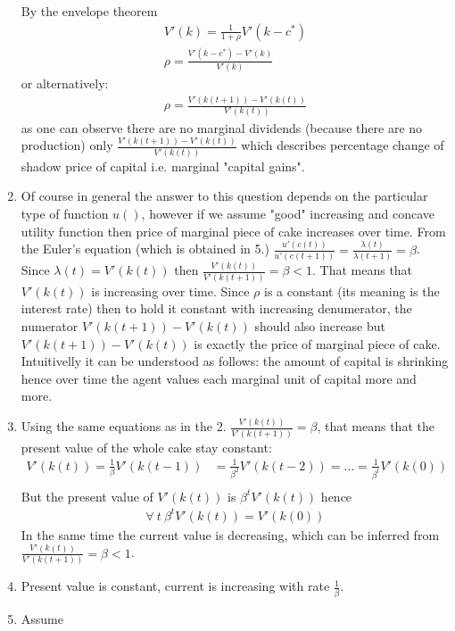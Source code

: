\documentclass[a4paper]{article}
\begin{document}
\begin{enumerate}
	
	By the envelope theorem
	\begin{align*}
	V'(k) = \frac{1}{1+\rho}V'(k-c^*)\\
	\rho = \frac{V'(k-c^*) - V'(k)}{V'(k)}
	\end{align*}
	or alternatively:
	\begin{align*}
	\rho = \frac{V'(k(t+1)) - V'(k(t))}{V'(k(t))}
	\end{align*}
	as one can observe there are no marginal dividends (because there are no production) only $\frac{V'(k(t+1)) - V'(k(t))}{V'(k(t))}$ which describes percentage change of shadow price of capital i.e. marginal "capital gains". 
	\item Of course in general the answer to this question depends on the particular type of function $u()$, however if we assume "good" increasing and concave utility function then price of marginal piece of cake increases over time. From the Euler's equation (which is obtained in 5.) $\frac{u'(c(t))}{u'(c(t+1))} = \frac{\lambda(t)}{\lambda(t+1)} = \beta$. Since $\lambda(t) = V'(k(t))$ then $\frac{V'(k(t))}{V'(k(t+1))} = \beta < 1$. That means that $V'(k(t))$ is increasing over time. Since $\rho$ is a constant (its meaning is the interest rate) then to hold it constant with increasing denumerator, the numerator $V'(k(t+1)) - V'(k(t))$ should also increase but $V'(k(t+1)) - V'(k(t))$ is exactly the price of marginal piece of cake. Intuitivelly it can be understood as follows: the amount of capital is shrinking hence over time the agent values each marginal unit of capital more and more. 
	\item Using the same equations as in the 2. $\frac{V'(k(t))}{V'(k(t+1))} = \beta$, that means that the present value of the whole cake stay constant: \begin{align*}
	V'(k(t)) = \frac{1}{\beta}V'(k(t-1)) &= \frac{1}{\beta^2}V'(k(t-2)) = \dots = \frac{1}{\beta^t}V'(k(0))\\
	\end{align*}
	But the present value of $V'(k(t))$ is $\beta^t V'(k(t))$ hence 
	\begin{align*}
	\forall\ t\ \beta^t V'(k(t)) = V'(k(0))
	\end{align*}
	In the same time the current value is decreasing, which can be inferred from $\frac{V'(k(t))}{V'(k(t+1))} = \beta < 1$.
	\item Present value is constant, current is increasing with rate $\frac{1}{\beta}$.
	\item Assume 
	\begin{align*}

\end{align*}
\end{enumerate}
\end{document}
